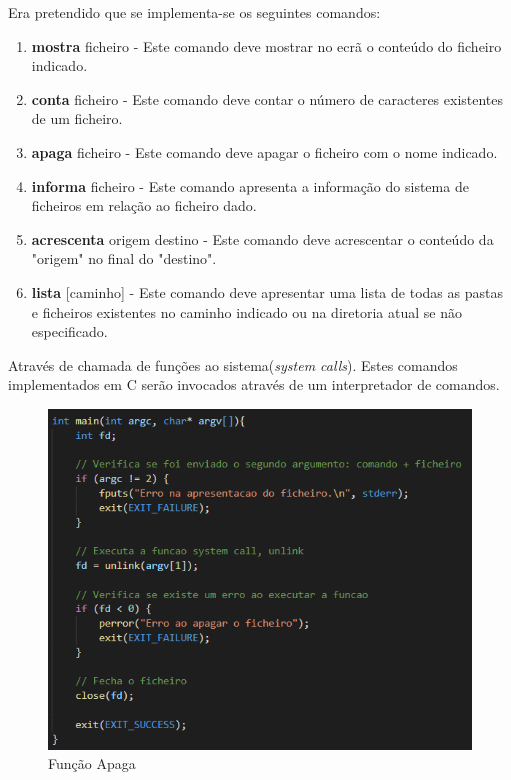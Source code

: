 \documentclass{article}
\begin{document}
	Era pretendido que se implementa-se os seguintes comandos:
	\begin{enumerate}
		\item \textbf{mostra} ficheiro - Este comando deve mostrar no ecrã o conteúdo do ficheiro indicado. 
		\item \textbf{conta} ficheiro - Este comando deve contar o número de caracteres existentes de um ficheiro.
		\item \textbf{apaga} ficheiro - Este comando deve apagar o ficheiro com o nome indicado.
		\item \textbf{informa} ficheiro - Este comando apresenta a informação do sistema de ficheiros em relação ao ficheiro dado.
		\item \textbf{acrescenta} origem destino - Este comando deve acrescentar o conteúdo da "origem" no final do "destino".
		\item \textbf{lista} [caminho] - Este comando deve apresentar uma lista de todas as pastas e ficheiros existentes no caminho indicado ou na diretoria atual se não especificado.
	\end{enumerate}
	\newpage
	\vspace*{2 em}
	Através de chamada de funções ao sistema(\textit{system calls}). Estes comandos implementados em C serão invocados através de um interpretador de comandos.
	
	\vspace*{4 em}
	\begin{figure}[!htb]
		\centering
		\includegraphics[scale=0.8]{apaga_parte1}
		\caption{Função Apaga}
	\end{figure}
	
\end{document}
